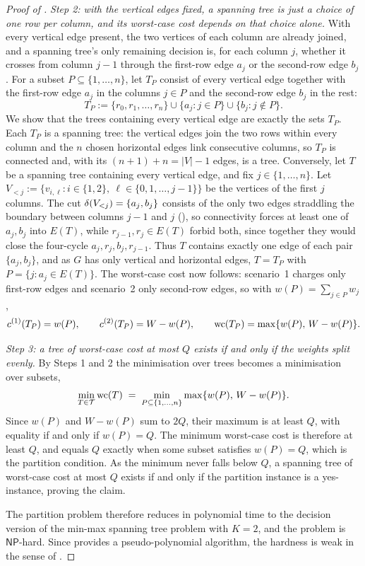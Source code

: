 \begin{proof}[Proof of ]
\emph{Step 2: with the vertical edges fixed, a spanning tree is just a choice of one row per column, and its worst-case cost depends on that choice alone.}
With every vertical edge present, the two vertices of each column are already joined, and a spanning tree's only remaining decision is, for each column $j$, whether it crosses from column $j - 1$ through the first-row edge $a_j$ or the second-row edge $b_j$.
For a subset $P \subseteq \{1, \ldots, n\}$, let $T_P$ consist of every vertical edge together with the first-row edge $a_j$ in the columns $j \in P$ and the second-row edge $b_j$ in the rest:
\[
T_P := \{r_0, r_1, \ldots, r_n\} \cup \{a_j : j \in P\} \cup \{b_j : j \notin P\}.
\]
We show that the trees containing every vertical edge are exactly the sets $T_P$.
Each $T_P$ is a spanning tree: the vertical edges join the two rows within every column and the $n$ chosen horizontal edges link consecutive columns, so $T_P$ is connected and, with its $(n + 1) + n = |V| - 1$ edges, is a tree.
Conversely, let $T$ be a spanning tree containing every vertical edge, and fix $j \in \{1, \ldots, n\}$.
Let $V_{<j} := \{v_{i,\ell} : i \in \{1, 2\},\ \ell \in \{0, 1, \ldots, j-1\}\}$ be the vertices of the first $j$ columns.
The cut $\delta(V_{<j}) = \{a_j, b_j\}$ consists of the only two edges straddling the boundary between columns $j - 1$ and $j$ (), so connectivity forces at least one of $a_j, b_j$ into $E(T)$, while $r_{j-1}, r_j \in E(T)$ forbid both, since together they would close the four-cycle $a_j, r_j, b_j, r_{j-1}$.
Thus $T$ contains exactly one edge of each pair $\{a_j, b_j\}$, and as $G$ has only vertical and horizontal edges, $T = T_P$ with $P = \{j : a_j \in E(T)\}$.
The worst-case cost now follows: scenario~1 charges only first-row edges and scenario~2 only second-row edges, so with $w(P) = \sum_{j \in P} w_j$,
\[
c^{(1)}(T_P) = w(P),
\qquad
c^{(2)}(T_P) = W - w(P),
\qquad
\mathrm{wc}(T_P) = \max\{w(P),\, W - w(P)\}.
\]

\emph{Step 3: a tree of worst-case cost at most $Q$ exists if and only if the weights split evenly.}
By Steps 1 and 2 the minimisation over trees becomes a minimisation over subsets,
\[
\min_{T \in \mathcal{T}} \mathrm{wc}(T)
\;=\;
\min_{P \subseteq \{1, \ldots, n\}} \max\{w(P),\, W - w(P)\}.
\]
Since $w(P)$ and $W - w(P)$ sum to $2Q$, their maximum is at least $Q$, with equality if and only if $w(P) = Q$.
The minimum worst-case cost is therefore at least $Q$, and equals $Q$ exactly when some subset satisfies $w(P) = Q$, which is the partition condition.
As the minimum never falls below $Q$, a spanning tree of worst-case cost at most $Q$ exists if and only if the partition instance is a yes-instance, proving the claim.

The partition problem therefore reduces in polynomial time to the decision version of the min-max spanning tree problem with $K = 2$, and the problem is $\mathsf{NP}$-hard.
Since  provides a pseudo-polynomial algorithm, the hardness is weak in the sense of .
\end{proof}

